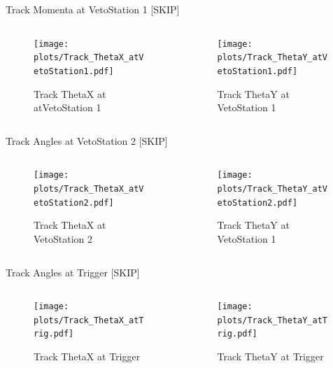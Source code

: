 \begin{subframe}{Track Momenta at VetoStation 1 [SKIP]}
	\begin{columns}
		\begin{column}{0.5\textwidth}
			\begin{figure}
				\texttt{[image: \\plots/Track\_ThetaX\_atVetoStation1.pdf]}
				\caption{Track ThetaX at atVetoStation 1}
			\end{figure}
		\end{column}
		\begin{column}{0.5\textwidth}
			\begin{figure}
				\texttt{[image: \\plots/Track\_ThetaY\_atVetoStation1.pdf]}
				\caption{Track ThetaY at VetoStation 1}
			\end{figure}
		\end{column}
	\end{columns}
\end{subframe}

\begin{subframe}{Track Angles at VetoStation 2 [SKIP]}
	\begin{columns}
		\begin{column}{0.5\textwidth}
			\begin{figure}
				\texttt{[image: \\plots/Track\_ThetaX\_atVetoStation2.pdf]}
				\caption{Track ThetaX at VetoStation 2}
			\end{figure}
		\end{column}
		\begin{column}{0.5\textwidth}
			\begin{figure}
				\texttt{[image: \\plots/Track\_ThetaY\_atVetoStation2.pdf]}
				\caption{Track ThetaY at VetoStation 1}
			\end{figure}
		\end{column}
	\end{columns}
\end{subframe}

\begin{subframe}{Track Angles at Trigger [SKIP]}
	\begin{columns}
		\begin{column}{0.5\textwidth}
			\begin{figure}
				\texttt{[image: \\plots/Track\_ThetaX\_atTrig.pdf]}
				\caption{Track ThetaX at Trigger}
			\end{figure}
		\end{column}
		\begin{column}{0.5\textwidth}
			\begin{figure}
				\texttt{[image: \\plots/Track\_ThetaY\_atTrig.pdf]}
				\caption{Track ThetaY at Trigger}
			\end{figure}
		\end{column}
	\end{columns}
\end{subframe}


